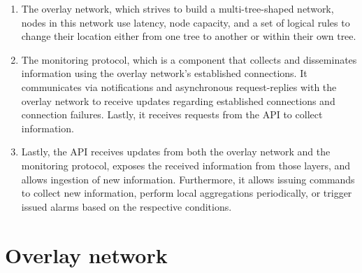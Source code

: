 \begin{enumerate}
    \item The overlay network, which strives to build a multi-tree-shaped network, nodes in this network use latency, node capacity, and a set of logical rules to change their location either from one tree to another or within their own tree.

    \item The monitoring protocol, which is a component that collects and disseminates information using the overlay network's established connections. It communicates via notifications and asynchronous request-replies with the overlay network to receive updates regarding established connections and connection failures. Lastly, it receives requests from the API to collect information.

    \item Lastly, the API receives updates from both the overlay network and the monitoring protocol, exposes the received information from those layers, and allows ingestion of new information. Furthermore, it allows issuing commands to collect new information, perform local aggregations periodically, or trigger issued alarms based on the respective conditions.
\end{enumerate}

\section{Overlay network} 
\label{sec:overlay_network}
